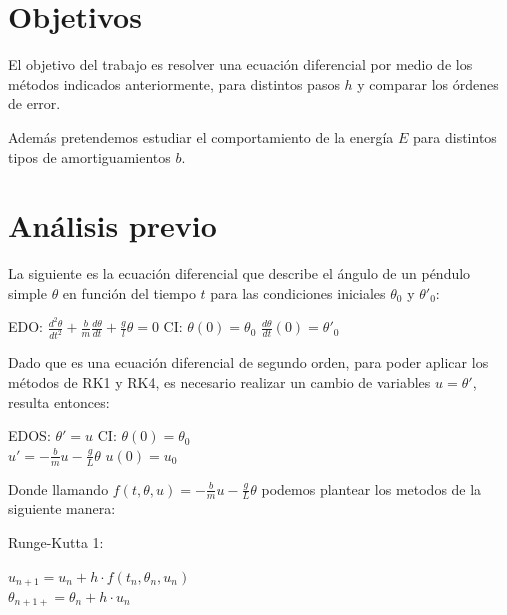 \documentclass[titlepage,a4paper]{article}
\begin{document}
\section{Objetivos}\label{sec:objetivos}
    El objetivo del trabajo es resolver una ecuación diferencial por medio de los métodos indicados anteriormente, para distintos pasos $h$ y comparar los órdenes de error. 
    
    Además pretendemos estudiar el comportamiento de la energía $E$ para distintos tipos de amortiguamientos $b$.


\section{Análisis previo}
    La siguiente es la ecuación diferencial que describe el ángulo de un péndulo simple $\theta$ en función del tiempo $t$ para las condiciones iniciales $\theta_0$ y $\theta'_0$:
    
    \begin{center}
        EDO: \hspace{2mm} $\frac{d^2\theta}{dt^2}+\frac{b}{m}\frac{d\theta}{dt} +\frac{g}{l}\theta = 0$ \hspace{5mm} CI: \hspace{2mm} $\theta(0) = \theta_0$ \hspace{3mm} $\frac{d\theta}{dt}(0) = \theta'_0$
    \end{center}
    
    Dado que es una ecuación diferencial de segundo orden, para poder aplicar los métodos de RK1 y RK4, es necesario realizar un cambio de variables $u = \theta'$, resulta entonces:
    
    \begin{center}
        EDOS: \hspace{2mm} $\theta' = u$ \hspace{15mm} CI: \hspace{2mm} $\theta(0) = \theta_0$ \\
        \hspace{15mm}$u' = -\frac{b}{m}u-\frac{g}{L}\theta$ \hspace{10mm} $u(0) = u_0$
    \end{center}
    
    Donde llamando $f(t, \theta, u) = -\frac{b}{m}u-\frac{g}{L}\theta$ podemos plantear los metodos de la siguiente manera:
        
    Runge-Kutta 1:
    
    \begin{center}
        $u_{n+1} = u_{n} + h \cdot f(t_n, \theta_n, u_n)$\\
        $\theta_{n+1+} = \theta_{n} + h \cdot u_n$
    \end{center}
    
\end{document}
